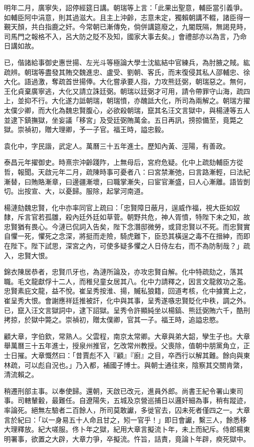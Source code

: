 \begin{pinyinscope}
明年二月，廣寧失，詔停經筵日講。朝瑞等上言：「此果出聖意，輔臣當引義爭。如輔臣阿中涓意，則其過滋大。且主上沖齡，志意未定，獨賴朝講不輟，諸臣得一覲天顏，共白指鹿之奸。今常朝已漸傳免，倘併講筵廢之，九閽既隔，無謁見時，司馬門之報格不入，呂大防之貶不及知，國家大事去矣。」會禮部亦以為言，乃命日講如故。

已，偕諸給事御史惠世揚、左光斗等極論大學士沈紘結中官練兵，為肘腋之賊。紘疏辨。朝瑞等盡發其賄交魏進忠、盧受、劉朝、客氏，而末復侵其私人邵輔忠、徐大化。語過激，奪疏首世揚俸。大化嘗承要人指，力攻熊廷弼，朝瑞惡之。無何，王化貞棄廣寧逃，大化又請立誅廷弼。朝瑞以廷弼才可用，請令帶罪守山海，疏四上，並抑不行。大化遂力詆朝瑞，朝瑞憤，亦醜詆大化，所司為兩解之。朝瑞方擢太僕少卿，而大化為魏忠賢腹心，必欲殺朝瑞，竄其名汪文言獄中，與楊漣等五人並逮下鎮撫獄，坐妄議「移宮」及受廷弼賄萬金。五日再訊，搒掠備至，竟斃之獄。崇禎初，贈大理卿，予一子官。福王時，謚忠毅。

袁化中，字民諧，武定人。萬曆三十五年進士。歷知內黃、涇陽，有善政。

泰昌元年擢御史。時熹宗沖齡踐阼，上無母后，宮府危疑。化中上疏劾輔臣方從哲，報聞。天啟元年二月，疏陳時事可憂者八：曰宮禁漸弛，曰言路漸輕，曰法紀漸替，曰賄賂漸章，曰邊疆漸壞，曰職掌漸失，曰宦官漸盛，曰人心漸離。語皆剴切。出按宣、大，以憂歸。服除，起掌河南道。

楊漣劾魏忠賢，化中亦率同官上疏曰：「忠賢障日蔽月，逞威作福，視大臣如奴隸，斥言官若孤雛，殺內廷外廷如草菅。朝野共危，神人胥憤，特陛下未之知，故忠賢猶有畏心。今漣已侃詞入告矣，陛下念潛邸微勞，或貸忠賢以不死。而忠賢實自懼一死，懼死之念深，將挺而走險，騎虎難下，臣恐其橫逞之毒不在搢紳，而即在陛下。陛下試思，深宮之內，可使多疑多懼之人日侍左右，而不為防制哉？」疏入，忠賢大恨。

錦衣陳居恭者，忠賢爪牙也，為漣所論及，亦攻忠賢自解。化中特疏劾之，落其職。毛文龍獻俘十二人，而稚兒童女居其八。化中力請釋之，因言文龍敘功之濫。忠賢素庇文龍，益不悅。崔呈秀按淮、揚，贓私狼籍，回道考核，化中據實上之，崔呈秀大恨。會謝應祥廷推被訐，化中與其事，呈秀遂嗾忠賢貶化中秩，調之外。已，竄入汪文言獄詞中，逮下詔獄。呈秀令許顯純坐以楊鎬、熊廷弼賄六千，酷刑拷掠，於獄中斃之。崇禎初，贈太僕卿，官其一子。福王時，追謚忠愍。

顧大章，字伯欽，常熟人。父雲程，南京太常卿。大章與弟大韶，孿生子也。大章舉萬曆三十五年進士，授泉州推官，乞改常州教授。父喪除，值朝中朋黨角立，正士日摧。大章慨然曰：「昔賈彪不入『顧』『廚』之目，卒西行以解其難。餘向與東林疏，可以彪自況也。」乃入都，補國子博士。與朝士通往來，陰察其交關肯綮，清流賴之。

稍遷刑部主事。以奉使歸。還朝，天啟已改元，進員外郎。尚書王紀令署山東司事。司轄輦轂，最難任。自遼陽失，五城及京營巡捕日以邏奸細為事，稍有蹤迹，率論死。絕無左驗者二百餘人，所司莫敢讞，多徙官去，囚未死者僅四之一。大章言於紀曰：「以一身易五十人命且甘之，矧一官乎！」即日會讞，繫三人，餘悉移大理釋放。紀大嗟服。佟卜年之獄，紀用大章言擬流卜年，未上而紀斥。侍郎楊東明署事，欲置之大辟，大章力爭，卒擬流。忤旨，詰責，竟論卜年辟，瘐死獄中。


\end{pinyinscope}
